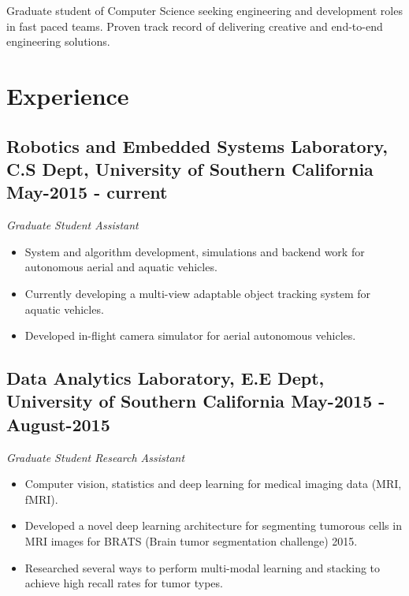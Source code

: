 \documentclass[10pt,letterpaper,sans]{moderncv}        %
\begin{document}
\pagestyle{empty}
\makecvtitle

\small{Graduate student of Computer Science seeking engineering and development roles in fast paced teams. Proven track record of delivering creative and end-to-end engineering solutions.}

\section{Experience}
\vspace{2pt}

\subsection{\textbf{Robotics and Embedded Systems Laboratory}, C.S Dept, University of Southern California \small{May-2015 - current}}
\textit{Graduate Student Assistant}\\
\begin {small}
\begin{itemize}
\item System and algorithm development, simulations and backend work for autonomous aerial and aquatic vehicles.
\item Currently developing a multi-view adaptable object tracking system for aquatic vehicles.
\item Developed in-flight camera simulator for aerial autonomous vehicles.
\end{itemize}
\end{small}

\subsection{\textbf{Data Analytics Laboratory}, E.E Dept, University of Southern California \small{May-2015 - August-2015}}
\textit{Graduate Student Research Assistant}\\
\begin {small}
\begin {itemize}
\item Computer vision, statistics and deep learning for medical imaging data (MRI, fMRI). 
\item Developed a novel deep learning architecture for segmenting tumorous cells in MRI images for BRATS (Brain tumor segmentation challenge) 2015.
\item Researched several ways to perform multi-modal learning and stacking to achieve high recall rates for tumor types.
\end {itemize}
\end{small}
\end{document}
